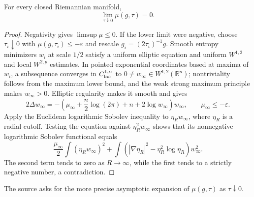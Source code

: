 \begin{proposition}
\label{prop:chow-iii-ch17-mu-small-scale-limit}
For every closed Riemannian manifold,
\[
 \lim_{\tau\downarrow0}\mu(g,\tau)=0.
\]
\end{proposition}
\begin{proof}
Negativity gives $\limsup\mu\le0$.  If the lower limit were negative, choose
$\tau_i\downarrow0$ with $\mu(g,\tau_i)\le-\varepsilon$ and rescale
$g_i=(2\tau_i)^{-1}g$.  Smooth entropy minimizers $w_i$ at scale $1/2$
satisfy a uniform elliptic equation and uniform $W^{1,2}$ and local
$W^{2,p}$ estimates.  In pointed exponential coordinates based at maxima of
$w_i$, a subsequence converges in $C^{1,\alpha}_{\rm loc}$ to
$0\ne w_\infty\in W^{1,2}(\mathbb R^n)$; nontriviality follows from the
maximum lower bound, and the weak strong maximum principle makes
$w_\infty>0$.  Elliptic regularity makes it smooth and gives
\[
 2\Delta w_\infty=-\left(\mu_\infty+\frac n2\log(2\pi)+n
 +2\log w_\infty\right)w_\infty,
 \qquad \mu_\infty\le-\varepsilon.
\]
Apply the Euclidean logarithmic Sobolev inequality to
$\eta_Rw_\infty$, where $\eta_R$ is a radial cutoff.  Testing the equation
against $\eta_R^2w_\infty$ shows that its nonnegative logarithmic Sobolev
functional equals
\[
 \frac{\mu_\infty}{2}\int(\eta_Rw_\infty)^2
 +\int(|\nabla\eta_R|^2-\eta_R^2\log\eta_R)w_\infty^2.
\]
The second term tends to zero as $R\to\infty$, while the first tends to a
strictly negative number, a contradiction.
\end{proof}

\begin{remark}
\label{rem:chow-iii-ch17-mu-small-scale-asymptotics-problem}
The source asks for the more precise asymptotic expansion of $\mu(g,\tau)$
as $\tau\downarrow0$.
\end{remark}

